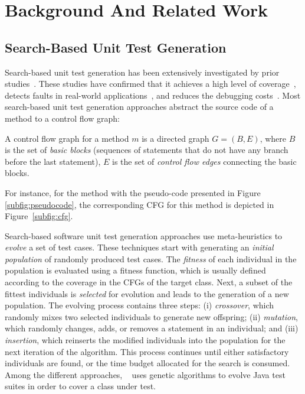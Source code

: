 
\section{Background And Related Work}
\label{sec:cub:background}

\subsection{Search-Based Unit Test Generation}
\label{sec:cub:unit-test-generation}

Search-based unit test generation has been extensively investigated by prior studies~\cite{Fraser2011, Fraser2014b, Panichella2018}. These studies have confirmed that it achieves a high level of coverage~\cite{Fraser2014b, Panichella2018}, detects faults in real-world applications~\cite{Fraser2015a,almasi2017industrial}, and reduces the debugging costs~\cite{Panichella2016}. 
Most search-based unit test generation approaches abstract the source code of a method to a control flow graph:
%
\begin{definition}
    A control flow graph for a method $m$ is a directed graph $G=(B,E)$, where $B$ is the set of \emph{basic blocks} (\ie sequences of statements that do not have any branch before the last statement), $E$ is the set of \emph{control flow edges} connecting the basic blocks.
\end{definition}
%
For instance, for the method with the pseudo-code presented in Figure \ref{subfig:pseudocode}, the corresponding CFG for this method is depicted in Figure~\ref{subfig:cfg}.

Search-based software unit test generation approaches use meta-heuristics to \emph{evolve} a set of test cases. These techniques start with generating an \emph{initial population} of randomly produced test cases.
The \emph{fitness} of each individual in the population is evaluated using a fitness function, which is usually defined according to the coverage in the CFGs of the target class. 
Next, a subset of the fittest individuals is \emph{selected} for evolution and leads to the generation of a new population. 
The evolving process contains three steps: (i) \emph{crossover}, which randomly mixes two selected individuals to generate new offspring; (ii) \emph{mutation}, which randomly changes, adds, or removes a statement in an individual; and (iii) \emph{insertion}, which reinserts the modified individuals into the population for the next iteration of the algorithm.
This process continues until either satisfactory individuals are found, or the time budget allocated for the search is consumed.
%
Among the different approaches, \evosuite~\cite{Fraser2011} uses genetic algorithms to evolve Java test suites in order to cover a class under test.

